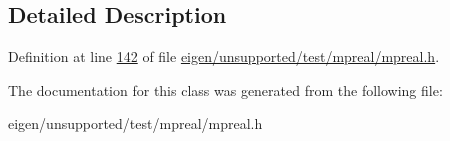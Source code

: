 \subsection{Detailed Description}


Definition at line \hyperlink{eigen_2unsupported_2test_2mpreal_2mpreal_8h_source_l00142}{142} of file \hyperlink{eigen_2unsupported_2test_2mpreal_2mpreal_8h_source}{eigen/unsupported/test/mpreal/mpreal.\+h}.



The documentation for this class was generated from the following file\+:\begin{DoxyCompactItemize}
\item 
eigen/unsupported/test/mpreal/mpreal.\+h\end{DoxyCompactItemize}
